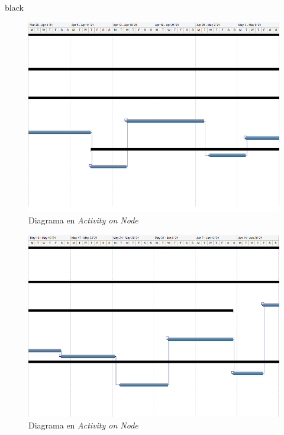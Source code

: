 \documentclass[11pt]{charter}
\begin{document}
\begin{consigna}{black}
\begin{figure}[htpb]
\centering 
\includegraphics[width=.9\textwidth]{./Figuras/c2.PNG}
\caption{Diagrama en \textit{Activity on Node}}
\label{fig:g2}
\end{figure}


\begin{figure}[htpb]
\centering 
\includegraphics[width=.9\textwidth]{./Figuras/c3.PNG}
\caption{Diagrama en \textit{Activity on Node}}
\label{fig:g3}
\end{figure}


\end{consigna}
\end{document}
